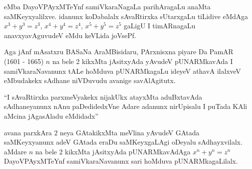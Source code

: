 eMba DayoVPAyxMTeYnf samiVkaraNagaLa parihAragaLu anaMta saMKeyxyalilxve. idanunx koDabalalx sAvaRtirxka sUtarxgaLu tiLidive eMdAga $x^3+y^3=z^3$, \quad $x^4+y^4=z^4$, \quad $x^5+y^5=z^5$ \quad gaLigU I timARnagaLu anavxyavAguvudeV eMdu keVLida joVsePf.

Aga jAnf mAsatxru BASaNa AraMBisidaru, PArxnisxna piyare Da PamAR {\rm (1601 - 1665)} $n$ na bele {\rm 2} kikxMta jAsitxyAda yAvudeV pUNARMkavAda I samiVkaraNavanunx tALe hoMduva pUNARMkagaLu ideyeV athavA ilalxveV eMbudakekx sAdhane niVDuvudu avanige savAlAgitutx.

``I sAvaRtirxka parxmeVyakekx nijakUkx atayxMta aduBxtavAda sAdhaneyanunx nAnu paDedidedxVne Adare adanunx nirUpisalu I puTada KAli aMcina jAgasAladu eMdidadx''

avana parxkAra $2$ neya GAtakikxMta meVlina yAvudeV GAtada saMKeyxyanunx adeV GAtada eraDu saMKeyxgaLAgi oDeyalu sAdhayxvilalx. aMdare $n$ na bele {\rm 2} kikxMta jAsitxyAda pUNARMkavAdAga \quad $x^n+y^n=z^n$ \quad DayoVPAyxMTeYnf samiVkaraNavanunx sari hoMduva pUNARMkagaLilalx.

